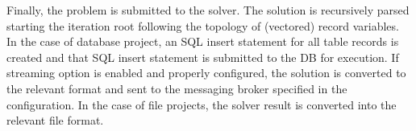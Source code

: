 Finally, the problem is submitted to the solver. The solution is recursively parsed starting the iteration root following the topology of (vectored) record variables. In the case of database project, an SQL insert statement for all table records is created and that SQL insert statement is submitted to the DB for execution. If streaming option is enabled and properly configured, the solution is converted to the relevant format and sent to the messaging broker specified in the configuration. In the case of file projects, the solver result is converted into the relevant file format.




